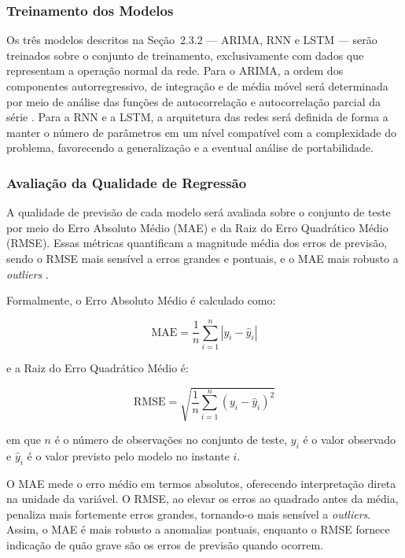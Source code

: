 \subsubsection{Treinamento dos Modelos}

Os três modelos descritos na Seção~2.3.2 — ARIMA, RNN e LSTM — serão 
treinados sobre o conjunto de treinamento, exclusivamente com dados que 
representam a operação normal da rede. Para o ARIMA, a ordem dos componentes 
autorregressivo, de integração e de média móvel será determinada por meio de 
análise das funções de autocorrelação e autocorrelação parcial da série 
\cite{box2015}. Para a RNN e a LSTM, a arquitetura das redes será definida 
de forma a manter o número de parâmetros em um nível compatível com a 
complexidade do problema, favorecendo a generalização e a eventual análise 
de portabilidade.


\subsubsection{Avaliação da Qualidade de Regressão}

A qualidade de previsão de cada modelo será avaliada sobre o conjunto de 
teste por meio do Erro Absoluto Médio (MAE) e da Raiz do Erro Quadrático 
Médio (RMSE). Essas métricas quantificam a magnitude média dos erros de 
previsão, sendo o RMSE mais sensível a erros grandes e pontuais, e o MAE 
mais robusto a \textit{outliers} \cite{hyndman2021}.

Formalmente, o Erro Absoluto Médio é calculado como:

\[
\mathrm{MAE} = \frac{1}{n} \sum_{i=1}^{n} |y_i - \hat{y}_i|
\]

e a Raiz do Erro Quadrático Médio é:

\[
\mathrm{RMSE} = \sqrt{\frac{1}{n} \sum_{i=1}^{n} (y_i - \hat{y}_i)^2}
\]

em que $n$ é o número de observações no conjunto de teste, $y_i$ é o 
valor observado e $\hat{y}_i$ é o valor previsto pelo modelo no instante $i$.

O MAE mede o erro médio em termos absolutos, oferecendo interpretação 
direta na unidade da variável. O RMSE, ao elevar os erros ao quadrado 
antes da média, penaliza mais fortemente erros grandes, tornando-o mais 
sensível a \textit{outliers}. Assim, o MAE é mais robusto a anomalias 
pontuais, enquanto o RMSE fornece indicação de quão grave são os erros 
de previsão quando ocorrem.


